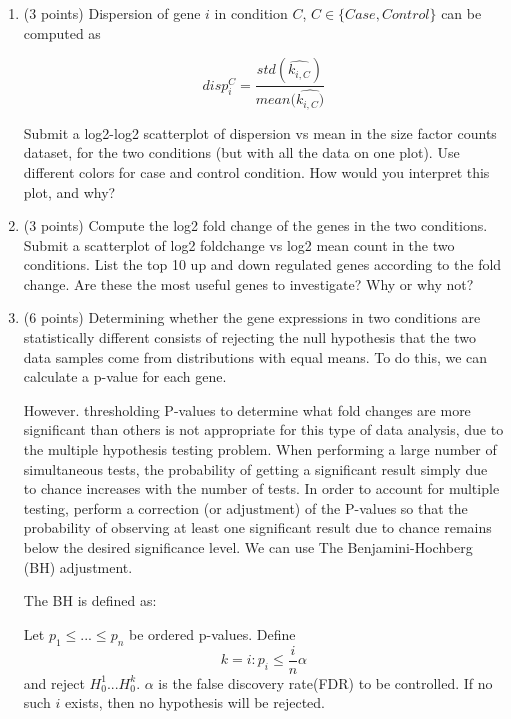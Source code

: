 \begin{enumerate}

\item (3 points) Dispersion of gene $i$ in condition $C$, $C\in \{Case, Control\}$ can be computed as 
 
$$disp_i^{C}=\frac{std(\hat{k_{i,C}})}{mean(\hat{k_{i,C})}}$$ 

Submit a log2-log2 scatterplot of dispersion vs mean in the size factor counts dataset, for the two conditions (but with all the data on one plot). Use different colors for case and control condition. How would you interpret this plot, and why?

\begin{solution}
\end{solution}

\item (3 points) Compute the log2 fold change of the genes in the two conditions. Submit a scatterplot of log2 foldchange vs log2 mean count in the two conditions. List the top 10 up and down regulated genes according to the fold change. Are these the most useful genes to investigate? Why or why not?

\begin{solution}
\end{solution}

\item (6 points) Determining whether the gene expressions in two conditions are statistically different consists of rejecting the null hypothesis that the two data samples come from distributions with equal means. To do this, we can calculate a p-value for each gene.

However. thresholding P-values to determine what fold changes are more significant than others is not appropriate for this type of data analysis, due to the multiple hypothesis testing problem. When performing a large number of simultaneous tests, the probability of getting a significant result simply due to chance increases with the number of tests. In order to account for multiple testing, perform a correction (or adjustment) of the P-values so that the probability of observing at least one significant result due to chance remains below the desired significance level. 
We can use The Benjamini-Hochberg (BH) adjustment.

The BH is defined as:

Let $p_1\leq ... \leq p_n$ be ordered p-values. Define
$$k = i : p_i \leq \frac{i}{n}\alpha$$
and reject $H_0^1...H_0^k$. $\alpha$ is the false discovery rate(FDR) to be controlled. If no such $i$ exists, then no hypothesis will be rejected. 


\end{enumerate}
